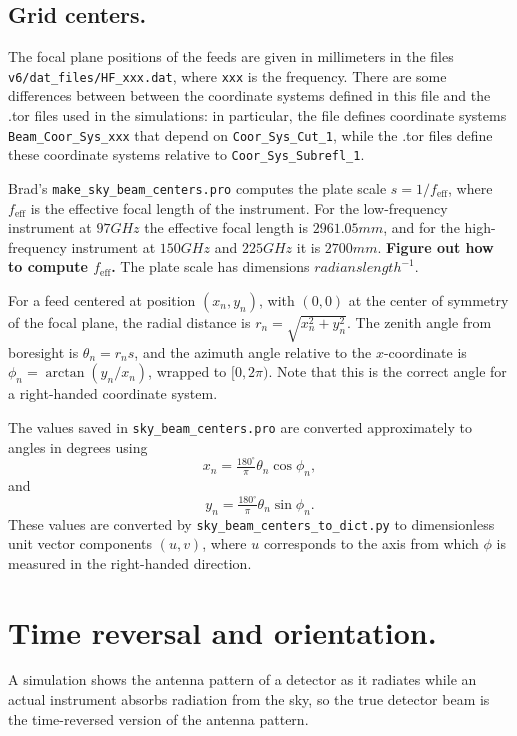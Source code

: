 \documentclass[10pt,english]{article}
\begin{document}
\subsection*{Grid centers.}

The focal plane positions of the feeds are given in millimeters in the files \texttt{v6/dat\_files/HF\_xxx.dat}, where \texttt{xxx} is the frequency. There are some differences between between the coordinate systems defined in this file and the .tor files used in the simulations: in particular, the file defines coordinate systems \texttt{Beam\_Coor\_Sys\_xxx} that depend on \texttt{Coor\_Sys\_Cut\_1}, while the .tor files define these coordinate systems relative to \texttt{Coor\_Sys\_Subrefl\_1}.

Brad's \texttt{make\_sky\_beam\_centers.pro} computes the plate scale $s = 1 / f_{\text{eff}}$, where $f_{\text{eff}}$ is the effective focal length of the instrument. For the low-frequency instrument at $97 \unit{GHz}$ the effective focal length is $2961.05 \unit{mm}$, and for the high-frequency instrument at $150 \unit{GHz}$ and $225 \unit{GHz}$ it is $2700 \unit{mm}$. \textbf{Figure out how to compute $f_{\text{eff}}$.} The plate scale has dimensions $\unit{radians} \unit{length}^{-1}$.

For a feed centered at position $(x_{n}, y_{n})$, with $(0, 0)$ at the center of symmetry of the focal plane, the radial distance is $r_{n} = \sqrt{x_{n}^{2} + y_{n}^{2}}$. The zenith angle from boresight is $\theta_{n} = r_{n} s$, and the azimuth angle relative to the $x$-coordinate is $\phi_{n} = \arctan(y_{n} / x_{n})$, wrapped to $[0, 2 \pi)$. Note that this is the correct angle for a right-handed coordinate system.

The values saved in \texttt{sky\_beam\_centers.pro} are converted approximately to angles in degrees using
\begin{equation*}
x_{n} = \tfrac{180^{\circ}}{\pi} \theta_{n} \cos \phi_{n},
\end{equation*}
and
\begin{equation*}
y_{n} = \tfrac{180^{\circ}}{\pi} \theta_{n} \sin \phi_{n}.
\end{equation*}
These values are converted by \texttt{sky\_beam\_centers\_to\_dict.py} to dimensionless unit vector components $(u, v)$, where $u$ corresponds to the axis from which $\phi$ is measured in the right-handed direction.

\section*{Time reversal and orientation.}

A simulation shows the antenna pattern of a detector as it radiates while an actual instrument absorbs radiation from the sky, so the true detector beam is the time-reversed version of the antenna pattern. 
\end{document}
